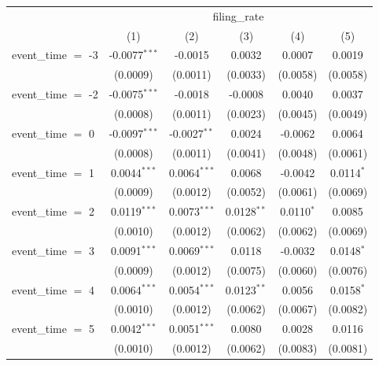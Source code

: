 
\begingroup
\centering
\begin{tabular}{lccccc}
   \toprule
    & \multicolumn{5}{c}{filing\_rate}\\
                       & (1)             & (2)            & (3)           & (4)           & (5)\\  
   \midrule 
   event\_time $=$ -3  & -0.0077$^{***}$ & -0.0015        & 0.0032        & 0.0007        & 0.0019\\   
                       & (0.0009)        & (0.0011)       & (0.0033)      & (0.0058)      & (0.0058)\\   
   event\_time $=$ -2  & -0.0075$^{***}$ & -0.0018        & -0.0008       & 0.0040        & 0.0037\\   
                       & (0.0008)        & (0.0011)       & (0.0023)      & (0.0045)      & (0.0049)\\   
   event\_time $=$ 0   & -0.0097$^{***}$ & -0.0027$^{**}$ & 0.0024        & -0.0062       & 0.0064\\   
                       & (0.0008)        & (0.0011)       & (0.0041)      & (0.0048)      & (0.0061)\\   
   event\_time $=$ 1   & 0.0044$^{***}$  & 0.0064$^{***}$ & 0.0068        & -0.0042       & 0.0114$^{*}$\\   
                       & (0.0009)        & (0.0012)       & (0.0052)      & (0.0061)      & (0.0069)\\   
   event\_time $=$ 2   & 0.0119$^{***}$  & 0.0073$^{***}$ & 0.0128$^{**}$ & 0.0110$^{*}$  & 0.0085\\   
                       & (0.0010)        & (0.0012)       & (0.0062)      & (0.0062)      & (0.0069)\\   
   event\_time $=$ 3   & 0.0091$^{***}$  & 0.0069$^{***}$ & 0.0118        & -0.0032       & 0.0148$^{*}$\\   
                       & (0.0009)        & (0.0012)       & (0.0075)      & (0.0060)      & (0.0076)\\   
   event\_time $=$ 4   & 0.0064$^{***}$  & 0.0054$^{***}$ & 0.0123$^{**}$ & 0.0056        & 0.0158$^{*}$\\   
                       & (0.0010)        & (0.0012)       & (0.0062)      & (0.0067)      & (0.0082)\\   
   event\_time $=$ 5   & 0.0042$^{***}$  & 0.0051$^{***}$ & 0.0080        & 0.0028        & 0.0116\\   
                       & (0.0010)        & (0.0012)       & (0.0062)      & (0.0083)      & (0.0081)\\   

\end{tabular}
